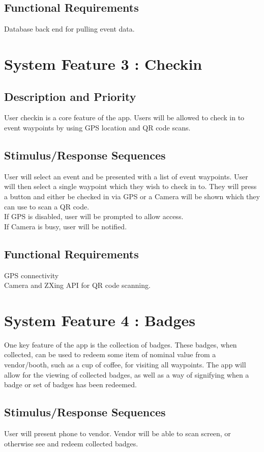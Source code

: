 \documentclass{scrreprt}
\begin{document}
\subsection{Functional Requirements}
Database back end for pulling event data.

\section{System Feature 3 : Checkin}

\subsection{Description and Priority}
User checkin is a core feature of the app. Users will be allowed to check in to event waypoints
by using GPS location and QR code scans.

\subsection{Stimulus/Response Sequences}
User will select an event and be presented with a list of event waypoints. User will then
select a single waypoint which they wish to check in to. They will press a button and either
be checked in via GPS or a Camera will be shown which they can use to scan a QR code. \\
If GPS is disabled, user will be prompted to allow access. \\
If Camera is busy, user will be notified.

\subsection{Functional Requirements}
GPS connectivity \\
Camera and ZXing API for QR code scanning.

\section{System Feature 4 : Badges}
One key feature of the app is the collection of badges. These badges, when collected,
can be used to redeem some item of nominal value from a vendor/booth, such as a 
cup of coffee, for visiting all waypoints. The app will allow for the viewing of collected 
badges, as well as a way of signifying when a badge or set of badges has been redeemed.

\subsection{Stimulus/Response Sequences}
User will present phone to vendor. Vendor will be able to scan screen, or otherwise 
see and redeem collected badges.
\end{document}
